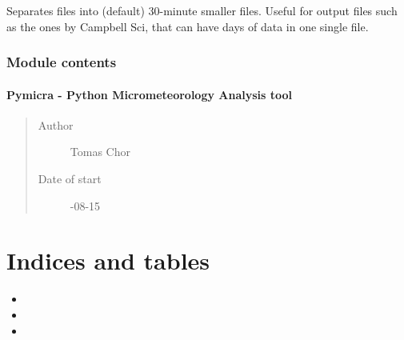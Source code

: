 \documentclass[a4paper,10pt,english]{sphinxmanual}
\begin{document}
\begin{fulllineitems}
\label{pymicra:pymicra.util.separateFiles}
Separates files into (default) 30-minute smaller files. Useful for output files such
as the ones by Campbell Sci, that can have days of data in one single file.

\end{fulllineitems}



\subsection{Module contents}
\label{pymicra:module-pymicra}\label{pymicra:module-contents}

\subsubsection{Pymicra - Python Micrometeorology Analysis tool}
\label{pymicra:pymicra-python-micrometeorology-analysis-tool}\begin{quote}\begin{description}
\item[{Author}] \leavevmode
Tomas Chor

\item[{Date of start}] -08-15

\end{description}\end{quote}


\chapter{Indices and tables}
\label{index:indices-and-tables}\begin{itemize}
\item {} 

\item {} 

\item {} 

\end{itemize}
\end{document}
